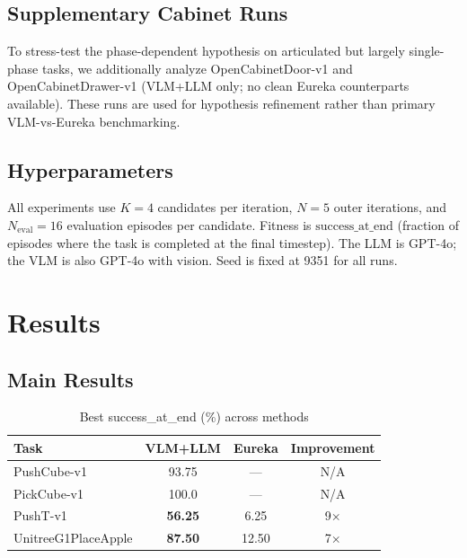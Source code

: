 \documentclass[conference]{IEEEtran}
\begin{document}
\subsection{Supplementary Cabinet Runs}

To stress-test the phase-dependent hypothesis on articulated but largely
single-phase tasks, we additionally analyze OpenCabinetDoor-v1 and
OpenCabinetDrawer-v1 (VLM+LLM only; no clean Eureka counterparts available).
These runs are used for hypothesis refinement rather than primary
VLM-vs-Eureka benchmarking.

\subsection{Hyperparameters}

All experiments use $K=4$ candidates per iteration, $N=5$ outer iterations, and
$N_{\text{eval}}=16$ evaluation episodes per candidate. Fitness is
$\text{success\_at\_end}$ (fraction of episodes where the task is completed at
the final timestep). The LLM is GPT-4o; the VLM is also GPT-4o with vision.
Seed is fixed at 9351 for all runs.



\section{Results}\label{sec:results}

\subsection{Main Results}

\begin{table}[htbp]
\caption{Best success\_at\_end (\%) across methods}
\label{tab:main}
\centering
\begin{tabular}{lccc}
\toprule
Task & VLM+LLM & Eureka & Improvement \\
\midrule
PushCube-v1 & 93.75 & --- & N/A \\
PickCube-v1 & 100.0 & --- & N/A \\
PushT-v1 & \textbf{56.25} & 6.25 & 9$\times$ \\
UnitreeG1PlaceApple & \textbf{87.50} & 12.50 & 7$\times$ \\
\bottomrule
\end{tabular}
\end{table}
\end{document}
